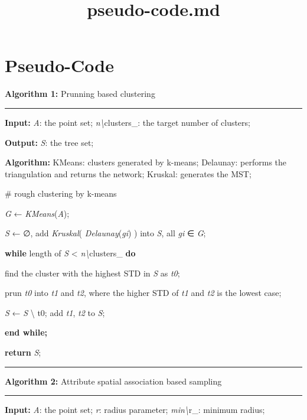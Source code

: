 \documentclass[]{article}
\title{pseudo-code.md}
\date{}
\begin{document}
\maketitle

\hypertarget{header-n0}{%
\section{Pseudo-Code}\label{header-n0}}

\textbf{Algorithm 1:} Prunning based clustering

\begin{center}\rule{0.5\linewidth}{\linethickness}\end{center}

\textbf{Input: } \emph{A}: the point set;
\emph{n\textbackslash{}}clusters\_: the target number of clusters;

\textbf{Output: } \emph{S}: the tree set;

\textbf{Algorithm: } KMeans: clusters generated by k-means; Delaunay:
performs the triangulation and returns the network; Kruskal: generates
the MST;

\# rough clustering by k-means

\emph{G} ← \emph{KMeans}(\emph{A});

\emph{S} ← ∅, add \emph{Kruskal}( \emph{Delaunay}(\emph{gi}) ) into
\emph{S}, all \emph{gi} ∈ \emph{G};

\textbf{while} length of \emph{S} \textless{}
\emph{n\textbackslash{}}clusters\_ \textbf{do}

find the cluster with the highest STD in \emph{S} as \emph{t0};

prun \emph{t0} into \emph{t1} and \emph{t2}, where the higher STD of
\emph{t1} and \emph{t2} is the lowest case;

\emph{S} ← \emph{S} \textbackslash{} t0; add \emph{t1}, \emph{t2} to
\emph{S};

\textbf{end while;}

\textbf{return} \emph{S};

\begin{center}\rule{0.5\linewidth}{\linethickness}\end{center}

\textbf{Algorithm 2:} Attribute spatial association based sampling

\begin{center}\rule{0.5\linewidth}{\linethickness}\end{center}

\textbf{Input: } \emph{A}: the point set; \emph{r}: radius parameter;
\emph{min\textbackslash{}}r\_: minimum radius;
\end{document}
